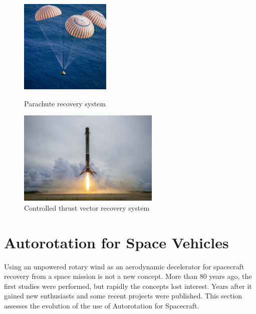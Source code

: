 \begin{figure}
    \centering
    \begin{minipage}{.45\textwidth}
      \centering
     \includegraphics[height=45mm]{Figures/introduction/parachute-system.jpg}
      \caption[Parachute recovery system]{Parachute recovery system \cite{noauthor_wikipedia_nodate}}
      \label{fig:parachute-system}
    \end{minipage}%
    \begin{minipage}{.05\textwidth}
         \text{ }
    \end{minipage}
    \begin{minipage}{.45\textwidth}
      \centering
      \includegraphics[height=45mm]{Figures/introduction/rocjet-thrust-vector.jpg}
      \caption[Controlled thrust vector recovery system]{Controlled thrust vector recovery system \cite{noauthor_spacex_nodate}}
      \label{fig:thurst-vector}
    \end{minipage}
\end{figure}

\section{Autorotation for Space Vehicles}
\label{section:autorotation_vehicles}

Using an unpowered rotary wind as an aerodynamic decelerator for spacecraft recovery from a space mission is not a new concept. More than 80 years ago, the first studies were performed, but rapidly the concepts lost interest. Years after it gained new enthusiasts and some recent projects were published. This section assesses the evolution of the use of Autorotation for Spacecraft.


